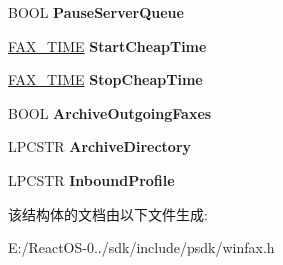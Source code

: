 \begin{DoxyCompactItemize}
\item 
\mbox{\label{struct___f_a_x___c_o_n_f_i_g_u_r_a_t_i_o_n_a_ac34a3818ff9924bd572fc0b040515248}} 
B\+O\+OL {\bfseries Pause\+Server\+Queue}
\item 
\mbox{\label{struct___f_a_x___c_o_n_f_i_g_u_r_a_t_i_o_n_a_a7ae0c3bc9e40e02b913a1f14ccf79dfc}} 
\hyperlink{struct___f_a_x___t_i_m_e}{F\+A\+X\+\_\+\+T\+I\+ME} {\bfseries Start\+Cheap\+Time}
\item 
\mbox{\label{struct___f_a_x___c_o_n_f_i_g_u_r_a_t_i_o_n_a_a750b7f8431d0b4c87be62b5e18223134}} 
\hyperlink{struct___f_a_x___t_i_m_e}{F\+A\+X\+\_\+\+T\+I\+ME} {\bfseries Stop\+Cheap\+Time}
\item 
\mbox{\label{struct___f_a_x___c_o_n_f_i_g_u_r_a_t_i_o_n_a_a3f321b0b761636a9753f04a930045210}} 
B\+O\+OL {\bfseries Archive\+Outgoing\+Faxes}
\item 
\mbox{\label{struct___f_a_x___c_o_n_f_i_g_u_r_a_t_i_o_n_a_a9944288a1c6ceb203b5639dea9c2874c}} 
L\+P\+C\+S\+TR {\bfseries Archive\+Directory}
\item 
\mbox{\label{struct___f_a_x___c_o_n_f_i_g_u_r_a_t_i_o_n_a_aa1d6a324587a1a2698fb90dd6aa04e98}} 
L\+P\+C\+S\+TR {\bfseries Inbound\+Profile}
\end{DoxyCompactItemize}


该结构体的文档由以下文件生成\+:\begin{DoxyCompactItemize}
\item 
E\+:/\+React\+O\+S-\/0../sdk/include/psdk/winfax.\+h\end{DoxyCompactItemize}
